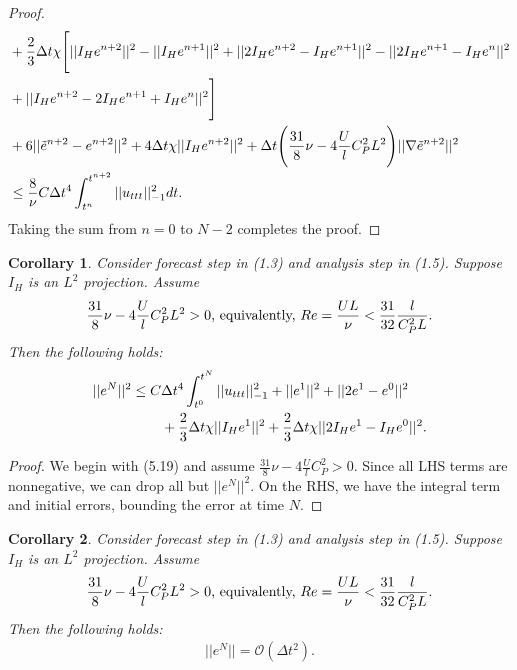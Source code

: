 \documentclass[11pt,a4paper]{article}
\newtheorem{corollary}{Corollary}[theorem]
\begin{document}
\begin{proof}
\begin{align}
        &+\frac{2}{3}\Delta t\chi \Bigg[ ||I_He^{n+2}||^2 - ||I_He^{n+1}||^2 + ||2I_He^{n+2}-I_He^{n+1}||^2 - ||2I_He^{n+1}-I_He^n||^2 \notag \\
        &+||I_He^{n+2}-2I_He^{n+1}+I_He^n||^2\Bigg]  \\
        &+6||\Tilde{e}^{n+2}-e^{n+2}||^2 +4\Delta t\chi ||I_He^{n+2}||^2 +\Delta t\Bigg(\frac{31}{8}\nu -4\frac{U}{l}C_P^2L^2\Bigg) ||\nabla \Tilde{e}^{n+2}||^2 \notag \\
        &\leq \frac{8}{\nu}C\Delta t^4\int_{t^n}^{t^{n+2}}||u_{ttt}||_{-1}^2dt. \notag
    \end{align}
    Taking the sum from $n = 0$ to $N-2$
    completes the proof.
\end{proof}

\begin{corollary}
    Consider forecast step in (1.3) and analysis step in (1.5). Suppose $I_H$ is an $L^2$ projection. Assume 
    \begin{align}
        \frac{31}{8}\nu-4\frac{U}{l}C_P^2L^2>0  \text{, equivalently, } Re=\frac{UL}{\nu}<\frac{31}{32}\frac{l}{C_P^2L}. \notag
    \end{align} Then the following holds:
    \begin{align}
        ||e^N||^2\leq C&\Delta t^4\int_{t^0}^{t^{N}}||u_{ttt}||_{-1}^2 + ||e^1||^2+||2e^1-e^0||^2 \notag \\
        &+\frac{2}{3}\Delta t\chi ||I_He^1||^2+\frac{2}{3}\Delta t\chi ||2I_He^1-I_He^0||^2.
    \end{align}
\end{corollary}

\begin{proof}
    We begin with (5.19) and assume $\frac{31}{8}\nu-4\frac{U}{l}C_P^2>0$. Since all LHS terms are nonnegative, we can drop all but $||e^N||^2$. On the RHS, we have the integral term and initial errors, bounding the error at time $N$.
\end{proof}

\begin{corollary}
    Consider forecast step in (1.3) and analysis step in (1.5). Suppose $I_H$ is an $L^2$ projection. Assume 
    \begin{align}
        \frac{31}{8}\nu-4\frac{U}{l}C_P^2L^2>0 \text{, equivalently, } Re=\frac{UL}{\nu}<\frac{31}{32}\frac{l}{C_P^2L}. \notag
    \end{align} Then the following holds:
    \begin{align}
        ||e^N||=\mathcal{O}(\Delta t^2).
    \end{align}
\end{corollary}
\end{document}
